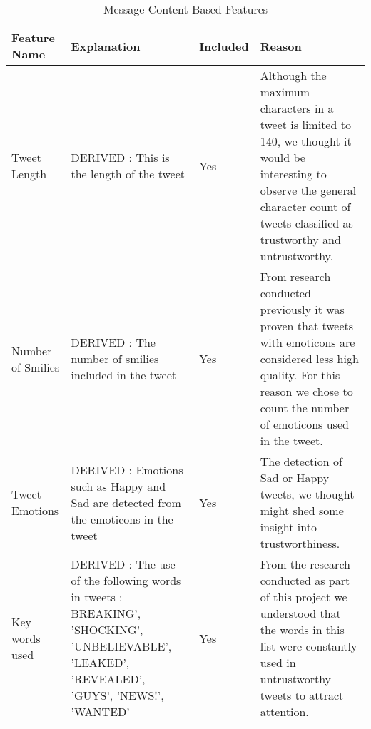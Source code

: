 \newpage
\begin{landscape}
\centering
\begin{longtable}{|C{1.00in}|C{2.50in}|C{.60in}|C{5.00in}|}
\caption{Message Content Based Features}\\
\toprule[1.5pt]
Feature Name & Explanation & Included & Reason \\\midrule
Tweet Length & DERIVED :  This is the length of the tweet & Yes & Although the maximum characters in a tweet is limited to 140, we thought it would be interesting to observe the general character count of tweets classified as trustworthy and untrustworthy. \\ 
\hline
Number of Smilies &DERIVED : The number of smilies included in the tweet &Yes&From research conducted previously it was proven that tweets with emoticons are considered less high quality. For this reason we chose to count the number of emoticons used in the tweet. \\
\hline
Tweet Emotions & DERIVED : Emotions such as Happy and Sad are detected from the emoticons in the tweet &Yes&The detection of Sad or Happy tweets, we thought might shed some insight into trustworthiness. \\
\hline
Key words used  &DERIVED : The use of the following words in tweets : BREAKING', 'SHOCKING', 'UNBELIEVABLE', 'LEAKED', 'REVEALED', 'GUYS', 'NEWS!', 'WANTED' &Yes & From the research conducted as part of this project we understood that the words in this list were constantly used in untrustworthy tweets to attract attention.\\
\hline
\bottomrule[1.25pt]
\end{longtable}
\label{tab:LPer}
\end{landscape}
